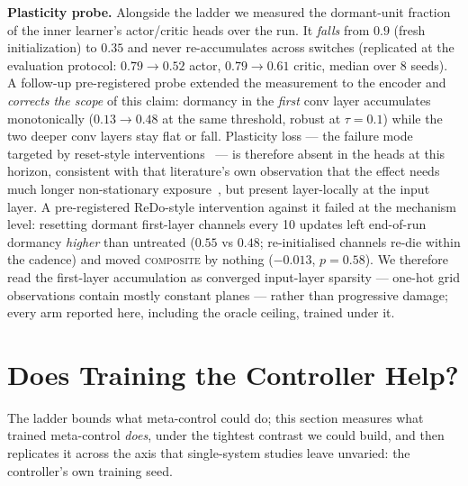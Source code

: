 \documentclass[11pt]{article}
\newcommand{\composite}{\textsc{composite}}
\begin{document}
\textbf{Plasticity probe.} Alongside the ladder we measured the dormant-unit
fraction~\citep{sokar2023dormant} of the inner learner's actor/critic heads
over the run. It \emph{falls} from $0.9$ (fresh initialization) to $0.35$ and
never re-accumulates across switches (replicated at the evaluation protocol:
$0.79 \to 0.52$ actor, $0.79 \to 0.61$ critic, median over 8 seeds). A
follow-up pre-registered probe extended the measurement to the encoder and
\emph{corrects the scope} of this claim: dormancy in the \emph{first} conv
layer accumulates monotonically ($0.13 \to 0.48$ at the same threshold,
robust at $\tau{=}0.1$) while the two deeper conv layers stay flat or fall.
Plasticity loss --- the failure mode targeted by reset-style
interventions~\citep{dohare2024plasticity,nikishin2022primacy} --- is
therefore absent in the heads at this horizon, consistent with that
literature's own observation that the effect needs much longer
non-stationary exposure~\citep{abbas2023plasticity,nikishin2023injection},
but present layer-locally at the input layer. A pre-registered
ReDo-style intervention against it failed at the mechanism level:
resetting dormant first-layer channels every 10 updates left end-of-run
dormancy \emph{higher} than untreated ($0.55$ vs $0.48$; re-initialised
channels re-die within the cadence) and moved \composite{} by nothing
($-0.013$, $p{=}0.58$). We therefore read the first-layer accumulation as
converged input-layer sparsity --- one-hot grid observations contain mostly
constant planes --- rather than progressive damage; every arm reported
here, including the oracle ceiling, trained under it.

\section{Does Training the Controller Help?}
\label{sec:replication}

The ladder bounds what meta-control could do; this section measures what
trained meta-control \emph{does}, under the tightest contrast we could build,
and then replicates it across the axis that single-system studies leave
unvaried: the controller's own training seed.
\end{document}

